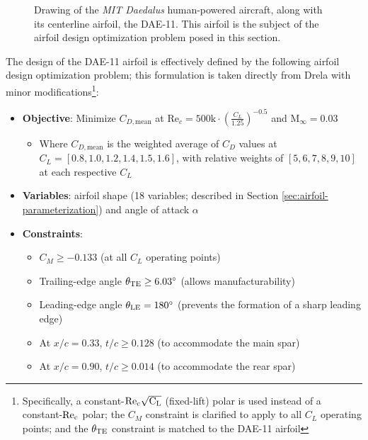 \documentclass[journal]{new-aiaa}
\begin{document}
\begin{figure}[h]
    \centering
    
    \caption{Drawing of the \emph{MIT Daedalus} human-powered aircraft, along with its centerline airfoil, the DAE-11. This airfoil is the subject of the airfoil design optimization problem posed in this section.}
    \label{fig:daedalus_iso}
\end{figure}

The design of the DAE-11 airfoil is effectively defined by the following airfoil design optimization problem; this formulation is taken directly from Drela \cite{drelaProsConsAirfoil1998} with minor modifications\footnote{Specifically, a constant-$\rm Re_c \sqrt{C_L}$ (fixed-lift) polar is used instead of a constant-$\rm Re_c$ polar; the $C_M$ constraint is clarified to apply to all $C_L$ operating points; and the $\theta_{\rm TE}$ constraint is matched to the DAE-11 airfoil}:

\begin{itemize}
    \item \textbf{Objective}: Minimize $C_{D, \mathrm{mean}}$ at $\mathrm{Re}_c = 500\mathrm{k} \cdot \left(\frac{C_L}{1.25}\right)^{-0.5}$ and $\mathrm{M}_\infty = 0.03$
          \begin{itemize}
              \item Where $C_{D, \mathrm{mean}}$ is the weighted average of $C_D$ values at $C_L = [0.8, 1.0, 1.2, 1.4, 1.5, 1.6]$, with relative weights of $[5, 6, 7, 8, 9, 10]$ at each respective $C_L$
          \end{itemize}
    \item \textbf{Variables}: airfoil shape (18 variables; described in Section \ref{sec:airfoil-parameterization}) and angle of attack $\alpha$
    \item \textbf{Constraints}:
          \begin{itemize}
              \item $C_M \geq -0.133$ (at all $C_L$ operating points)
              \item Trailing-edge angle $\theta_{\rm TE} \geq 6.03^\circ$ (allows manufacturability)
              \item Leading-edge angle $\theta_{\rm LE} = 180^\circ$ (prevents the formation of a sharp leading edge)
              \item At $x/c = 0.33$, $t/c \geq 0.128$ (to accommodate the main spar)
              \item At $x/c = 0.90$, $t/c \geq 0.014$ (to accommodate the rear spar)
          \end{itemize}
\end{itemize}
\end{document}
